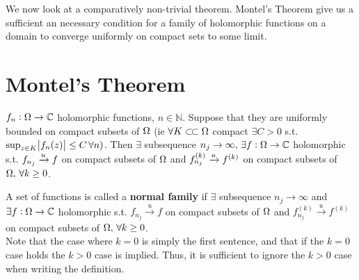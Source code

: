 \begin{center}
\end{center}





We now look at a comparatively non-trivial theorem. Montel's Theorem give us a sufficient an necessary condition for a family of holomorphic functions on a domain to converge uniformly on compact sets to some limit.


\section{Montel's Theorem}

\begin{theorem}
$f_n: \Omega \to \mathbb{C}$ holomorphic functions, $n \in \mathbb{N}$. Suppose that they are uniformly bounded on compact subsets of $\Omega$ (ie $\forall K \ssubset \om $ compact $ \exists C > 0 $ s.t. $ \sup_{z \in K} \abs{f_n(z)} \leq C \, \forall n)$. Then $\exists $ subsequence $n_j \to \infty, \, \exists f:\Omega \rightarrow \mathbb{C}  $ holomorphic s.t. $f_{n_j} \xrightarrow[]{u} f$ on compact subsets  of $\Omega$ and $f_{n_j}^{(k)} \xrightarrow[]{u} f^{(k)}$ on compact subsets of $\Omega , \, \forall k \geq 0$.
\end{theorem}


\begin{definition}
A set of functions is called a \textbf{normal family} if $\exists $ subsequence $n_j \to \infty$ and $ \exists f:\Omega \rightarrow \mathbb{C}  $ holomorphic s.t. $f_{n_j} \xrightarrow[]{u} f$ on compact subsets  of $\Omega$ and $f_{n_j}^{(k)} \xrightarrow[]{u} f^{(k)}$ on compact subsets of $\Omega , \, \forall k \geq 0$.\\

Note that the case where $k=0$ is simply the first sentence, and that if the $k=0$ case holds the $k>0$ case is implied. Thus, it is sufficient to ignore the $k>0$ case when writing the definition.
\end{definition}


